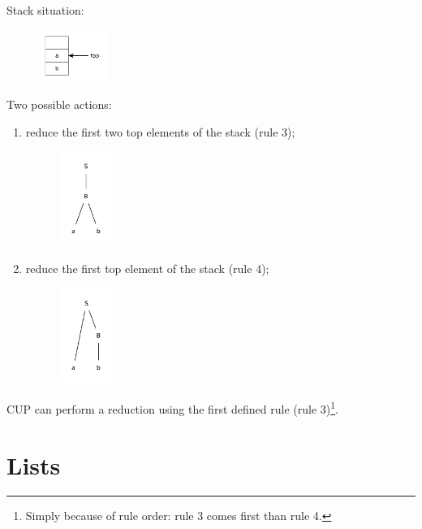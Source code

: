 Stack situation:
\begin{figure}[H]
    \centerline{\includegraphics[width=0.2\textwidth]{img/24.pdf}}
\end{figure}
Two possible actions:
\begin{enumerate}
    \item
    reduce the first two top elements of the stack (rule 3);
    \begin{figure}[H]
        \centerline{\includegraphics[width=0.17\textwidth]{img/25.pdf}}
    \end{figure}
    \item
    reduce the first top element of the stack (rule 4);
    \begin{figure}[H]
        \centerline{\includegraphics[width=0.17\textwidth]{img/26.pdf}}
    \end{figure}
\end{enumerate}
CUP can perform a reduction using the first defined rule (rule 3)\footnote{Simply because of rule order: rule 3 comes first than rule 4.}.

\section{Lists}
